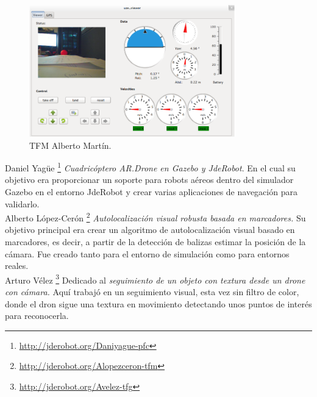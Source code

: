 \begin{figure}[H]
	\begin{center}
		\includegraphics[width=0.8\textwidth]{imag/IMG8.png}
				\caption{TFM Alberto Martín.} 
	\label{fig:TFM Alberto M.}	
	\end{center}
\end{figure}

\hspace{1cm} Daniel Yagüe  \footnote{\url{http://jderobot.org/Daniyague-pfc}} \cite{DanielYague} \textit{Cuadricóptero AR.Drone en Gazebo y JdeRobot}. En el cual su objetivo era proporcionar un soporte para robots aéreos dentro del simulador Gazebo en el entorno JdeRobot y crear varias aplicaciones de navegación para validarlo.
\\

\hspace{1cm} Alberto López-Cerón \footnote{\url{http://jderobot.org/Alopezceron-tfm}} \cite{AlbertoLopez} \textit{Autolocalización visual robusta basada en marcadores.} Su objetivo principal era crear un algoritmo de autolocalización visual basado en marcadores, es decir, a partir de la detección de balizas estimar la posición de la cámara. Fue creado tanto para el entorno de simulación como para entornos reales.
\\

\hspace{1cm} Arturo Vélez \footnote{\url{http://jderobot.org/Avelez-tfg}} \cite{ArturoVelez} Dedicado al \textit{seguimiento de un objeto con textura desde un drone con cámara.} Aquí trabajó en un seguimiento visual, esta vez sin filtro de color, donde el dron sigue una textura en movimiento detectando unos puntos de interés para reconocerla.
\\

